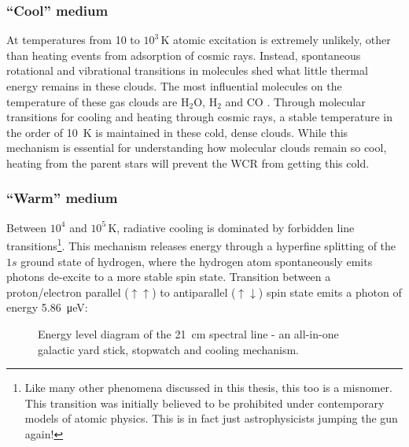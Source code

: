 \subsubsection{``Cool'' medium}

At temperatures from 10 to $10^3 \, \si{\kelvin}$ atomic excitation is extremely unlikely, other than heating events from adsorption of cosmic rays.
Instead, spontaneous rotational and vibrational transitions in molecules shed what little thermal energy remains in these clouds.
The most influential molecules on the temperature of these gas clouds are $\text{H}_2 \text{O}$, $\text{H}_2$ and $\text{CO}$
\parencite{neufeldRadiativeCoolingWarm1993,neufeldThermalBalanceDense1995}.
Through molecular transitions for cooling and heating through cosmic rays, a stable temperature in the order of \SI{10}{\kelvin} is maintained in these cold, dense clouds.
While this mechanism is essential for understanding how molecular clouds remain so cool, heating from the parent stars will prevent the WCR from getting this cold.

\subsubsection{``Warm'' medium}

Between $10^4$ and $10^5 \, \si{\kelvin}$, radiative cooling is dominated by forbidden line transitions\footnote{Like many other phenomena discussed in this thesis, this too is a misnomer. This transition was initially believed to be prohibited under contemporary models of atomic physics. This is in fact just astrophysicists jumping the gun again!}.
This mechanism releases energy through a hyperfine splitting of the $1s$ ground state of hydrogen, where the hydrogen atom spontaneously emits photons de-excite to a more stable spin state.
Transition between a proton/electron parallel ($\uparrow\uparrow$) to antiparallel ($\uparrow\downarrow$) spin state emits a photon of energy \SI{5.86}{\micro\electronvolt}:

\begin{figure}[H]
  \caption[The \SI{21}{cm} spectral line]{Energy level diagram of the \SI{21}{cm} spectral line - an all-in-one galactic yard stick, stopwatch and cooling mechanism.}
  \label{fig:quiver-h}
\end{figure}

